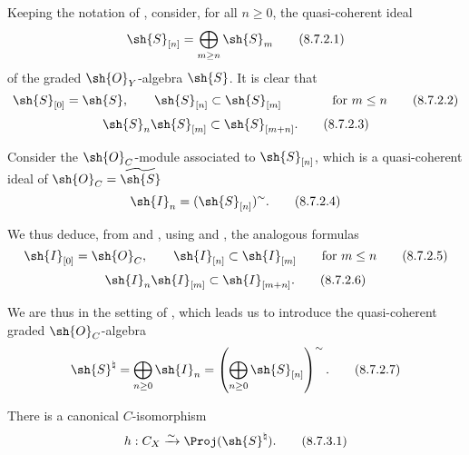 \begin{env}[8.7.2]
\label{II.8.7.2}
Keeping the notation of , consider, for all $n\geq0$, the quasi-coherent ideal
\[
\label{II.8.7.2.1}
  \sh{S}_{[n]} = \bigoplus_{m\geq n}\sh{S}_m
\tag{8.7.2.1}
\]
of the graded $\sh{O}_Y$-algebra $\sh{S}$.
It is clear that
\[
\label{II.8.7.2.2}
  \sh{S}_{[0]} = \sh{S},
  \qquad
  \sh{S}_{[n]} \subset \sh{S}_{[m]}
  \qquad\qquad
  \mbox{for $m\leq n$}
\tag{8.7.2.2}
\]
\[
\label{II.8.7.2.3}
  \sh{S}_{n} \sh{S}_{[m]} \subset \sh{S}_{[m+n]}.
\tag{8.7.2.3}
\]

Consider the $\sh{O}_C$-module associated to $\sh{S}_{[n]}$, which is a quasi-coherent ideal of $\sh{O}_C = \widetilde{\sh{S}}$ 
\[
\label{II.8.7.2.4}
  \sh{I}_n = (\sh{S}_{[n]})^\sim.
\tag{8.7.2.4}
\]

We thus deduce, from  and , using  and , the analogous formulas
\[
\label{II.8.7.2.5}
  \sh{I}_{[0]} = \sh{O}_C,
  \qquad
  \sh{I}_{[n]} \subset \sh{I}_{[m]}
  \qquad
  \text{for }m\leq n
\tag{8.7.2.5}
\]
\[
\label{II.8.7.2.6}
  \sh{I}_{n} \sh{I}_{[m]} \subset \sh{I}_{[m+n]}.
\tag{8.7.2.6}
\]

We are thus in the setting of , which leads us to introduce the quasi-coherent graded $\sh{O}_C$-algebra
\[
\label{II.8.7.2.7}
  \sh{S}^\natural
  =
  \bigoplus_{n\geq0}\sh{I}_n
  =
  \left(
    \bigoplus_{n\geq0} \sh{S}_{[n]}
  \right)^\sim.
\tag{8.7.2.7}
\]
\end{env}

\begin{proposition}[8.7.3]
\label{II.8.7.3}
There is a canonical $C$-isomorphism
\[
\label{II.8.7.3.1}
  h: C_X \xrightarrow{\sim} \Proj(\sh{S}^\natural).
\tag{8.7.3.1}
\]
\end{proposition}

